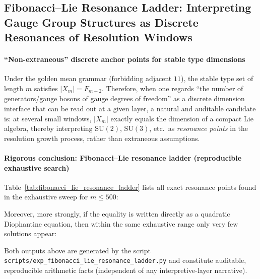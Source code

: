 \subsection{Fibonacci--Lie Resonance Ladder: Interpreting Gauge Group Structures as Discrete Resonances of Resolution Windows}\label{subsec:fib-lie-resonance}

\paragraph{``Non-extraneous'' discrete anchor points for stable type dimensions}
Under the golden mean grammar (forbidding adjacent \(11\)), the stable type set of length \(m\) satisfies
\(
|X_m|=F_{m+2}
\).
Therefore, when one regards ``the number of generators/gauge bosons of gauge degrees of freedom'' as a discrete dimension interface that can be read out at a given layer,
a natural and auditable candidate is: at several small windows, \(|X_m|\) exactly equals the dimension of a compact Lie algebra,
thereby interpreting \(\mathrm{SU}(2)\), \(\mathrm{SU}(3)\), etc.\ as \emph{resonance points} in the resolution growth process, rather than extraneous assumptions.

\paragraph{Rigorous conclusion: Fibonacci--Lie resonance ladder (reproducible exhaustive search)}
Table~\ref{tab:fibonacci_lie_resonance_ladder} lists all exact resonance points found in the exhaustive sweep for \(m\le 500\):

Moreover, more strongly, if the equality is written directly as a quadratic Diophantine equation, then within the same exhaustive range only very few solutions appear:

Both outputs above are generated by the script \texttt{scripts/exp\_fibonacci\_lie\_resonance\_ladder.py}
and constitute auditable, reproducible arithmetic facts (independent of any interpretive-layer narrative).

